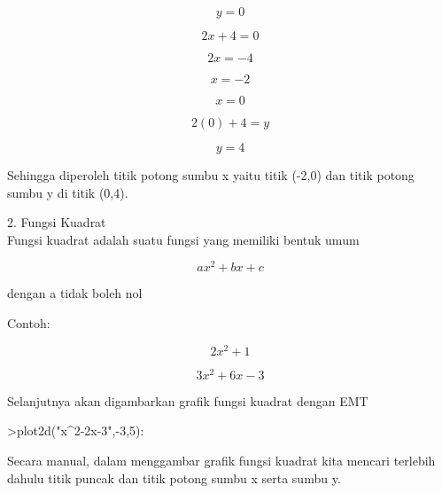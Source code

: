 \documentclass{article}
\begin{document}
\begin{eulernotebook}
\begin{eulercomment}
\begin{eulercomment}
\begin{eulercomment}
\begin{eulercomment}
\begin{eulercomment}
\begin{eulercomment}
\begin{eulercomment}
\end{eulercomment}
\begin{eulerformula}
\[
y = 0
\]
\end{eulerformula}
\begin{eulerformula}
\[
2x+4=0
\]
\end{eulerformula}
\begin{eulerformula}
\[
2x=-4
\]
\end{eulerformula}
\begin{eulerformula}
\[
x=-2
\]
\end{eulerformula}
\begin{eulercomment}
\end{eulercomment}
\begin{eulerformula}
\[
x=0
\]
\end{eulerformula}
\begin{eulerformula}
\[
2(0)+4=y
\]
\end{eulerformula}
\begin{eulerformula}
\[
y = 4
\]
\end{eulerformula}
\begin{eulercomment}
Sehingga diperoleh titik potong sumbu x yaitu titik (-2,0) dan titik
potong sumbu y di titik (0,4).\\
\end{eulercomment}
\eulersubheading{}
\begin{eulercomment}
2. Fungsi Kuadrat\\
Fungsi kuadrat adalah suatu fungsi yang memiliki bentuk umum\\
\end{eulercomment}
\begin{eulerformula}
\[
ax^2+bx+c
\]
\end{eulerformula}
\begin{eulercomment}
dengan a tidak boleh nol

Contoh: \\
\end{eulercomment}
\begin{eulerformula}
\[
2x^2+1
\]
\end{eulerformula}
\begin{eulerformula}
\[
3x^2+6x-3
\]
\end{eulerformula}
\begin{eulercomment}
Selanjutnya akan digambarkan grafik fungsi kuadrat dengan EMT

\end{eulercomment}
\begin{eulerprompt}
>plot2d("x^2-2x-3",-3,5):
\end{eulerprompt}
\begin{eulercomment}
Secara manual, dalam menggambar grafik fungsi kuadrat kita mencari
terlebih dahulu titik puncak dan titik potong sumbu x serta sumbu y.


\end{eulercomment}
\end{eulercomment}
\end{eulercomment}
\end{eulercomment}
\end{eulercomment}
\end{eulercomment}
\end{eulercomment}
\end{eulernotebook}
\end{document}
